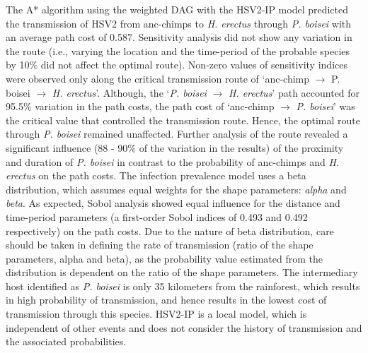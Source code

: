 \documentclass[fleqn,10pt]{wlscirep}
\begin{document}
The A* algorithm using the weighted DAG with the HSV2-IP model predicted the transmission of HSV2 from anc-chimps to \textit{H. erectus} through \textit{P. boisei} with an average path cost of 0.587. Sensitivity analysis did not show any variation in the route (i.e., varying the location and the time-period of the probable species by 10\% did not affect the optimal route). Non-zero values of sensitivity indices were observed only along the critical transmission route of `anc-chimp $\rightarrow$ P. boisei $\rightarrow$ \textit{H. erectus}'. Although, the `\textit{P. boisei} $\rightarrow$ \textit{H. erectus}' path accounted for 95.5\% variation in the path costs, the path cost of `anc-chimp $\rightarrow$ \textit{P. boisei}' was the critical value that controlled the transmission route. Hence, the optimal route through \textit{P. boisei} remained unaffected. Further analysis of the route revealed a significant influence (88 - 90\% of the variation in the results) of the proximity and duration of \textit{P. boisei} in contrast to the probability of anc-chimps and \textit{H. erectus} on the path costs. The infection prevalence model uses a beta distribution, which assumes equal weights for the shape parameters: \textit{alpha} and \textit{beta}. As expected, Sobol analysis showed equal influence for the distance and time-period parameters (a first-order Sobol indices of 0.493 and 0.492 respectively) on the path costs. Due to the nature of beta distribution, care should be taken in defining the rate of transmission (ratio of the shape parameters, alpha and beta), as the probability value estimated from the distribution is dependent on the ratio of the shape parameters. The intermediary host identified as \textit{P. boisei} is only 35 kilometers from the rainforest, which results in high probability of transmission, and hence results in the lowest cost of transmission through this species. HSV2-IP is a local model, which is independent of other events and does not consider the history of transmission and the associated probabilities.
\end{document}

